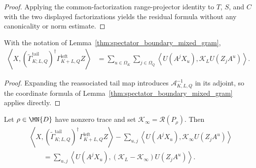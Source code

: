 \begin{proof}
    \leanok
    Applying the common-factorization range-projector identity to $T$, $S$, and
    $C$ with the two displayed factorizations yields the residual formula
    without any canonicality or norm estimate.
\end{proof}

\begin{lemma}
    \label{thm:whole_increment_mixed_gram}
    \leanok
    With the notation of
    Lemma~\ref{thm:spectator_boundary_mixed_gram},
    \begin{align}
        \left\langle X,
        (\widetilde\Gamma^{\mathrm{tail}}_{K;L,Q})^\dagger
        \Gamma^{\mathrm{left}}_{K+L,Q}Z\right\rangle
         & =\sum_{u\in\Omega_K}\sum_{j\in\Omega_Q}
        \left\langle U(A^jX_u),\mathcal K_LU(Z_jA^u)\right\rangle.
    \end{align}
\end{lemma}

\begin{proof}
    \leanok
    Expanding the reassociated tail map introduces $\mathscr A_{K,L,Q}^{-1}$ in
    its adjoint, so the coordinate formula of
    Lemma~\ref{thm:spectator_boundary_mixed_gram} applies directly.
\end{proof}

\begin{lemma}
    \label{thm:whole_increment_mixed_gram_centered}
    \leanok
    Let $\rho\in\MN{D}$ have nonzero trace and set
    $\mathcal K_\infty=\mathscr R(P_\rho)$.  Then
    \begin{align}
         & \left\langle X,
        (\widetilde\Gamma^{\mathrm{tail}}_{K;L,Q})^\dagger
        \Gamma^{\mathrm{left}}_{K+L,Q}Z\right\rangle
        -\sum_{u,j}\left\langle U(A^jX_u),
        \mathcal K_\infty U(Z_jA^u)\right\rangle \\
         & \qquad=
        \sum_{u,j}\left\langle U(A^jX_u),
        (\mathcal K_L-\mathcal K_\infty)U(Z_jA^u)\right\rangle.
    \end{align}
\end{lemma}

